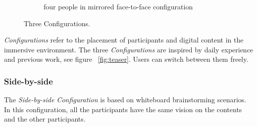 \documentclass[chi_draft]{sigchi}
\begin{document}
\begin{figure}
\begin{subfigure}[b]{0.3\columnwidth}
        \caption{four people in mirrored face-to-face configuration}
        \label{fig:f2f4}
    \end{subfigure}
    \caption{Three Configurations.}\label{fig:config}
\end{figure}
\textit{Configurations} refer to the placement of participants and digital content in the immersive environment. The three \textit{Configurations} are inspired by daily experience and previous work, see figure ~\ref{fig:teaser}. Users can switch between them freely.
\subsubsection{Side-by-side}
The \textit{Side-by-side Configuration} is based on whiteboard brainstorming scenarios. In this configuration, all the participants have the same vision on the contents and the other participants.

\end{document}
